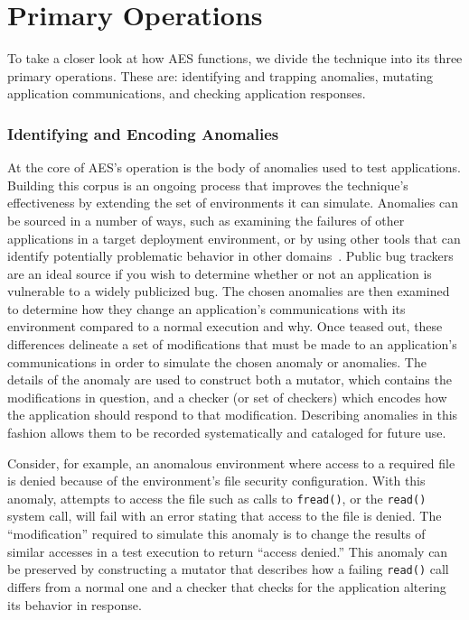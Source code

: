\section{Primary Operations}
\label{SEC:PrimaryOperations}

To take a closer look at how AES functions,
we divide the technique
into its three primary operations.
These are:
identifying and trapping anomalies,
mutating application communications,
and checking application responses.

\subsubsection{Identifying and Encoding Anomalies}
\label{SUBSUB:IdentifyingAndEncoding}
At the core of AES's operation is the body of anomalies
used to test applications.
Building this corpus is an ongoing process that improves the technique's
effectiveness by extending the set of environments it can simulate.
Anomalies can be sourced
in a number of ways,
such as
examining the failures of other applications
in a target deployment environment,
or by using other tools that can identify
potentially problematic behavior in other domains~\cite{Zhuang_NSDI_2014,
rasley2015detecting}.
Public bug trackers are an ideal source
if you wish to determine
whether or not an application
is vulnerable to a widely publicized bug.
The chosen anomalies are then examined
to determine how they change an application's communications
with its environment
compared to a normal execution and why.
Once teased out,
these differences delineate
a set of modifications
that must be made to an application's communications
in order to simulate the chosen anomaly or anomalies.
The details of the anomaly are used to
construct both a mutator,
which contains the modifications in question,
and a checker
(or set of checkers)
which encodes how the application should respond to that modification.
Describing anomalies in this fashion
allows them to be recorded systematically and cataloged for future use.

Consider,
for example,
an anomalous environment
where access to a required file is denied because of
the environment's file security configuration.
With this anomaly,
attempts to access the file
such as calls to {\tt fread()},
or the {\tt read()} system call,
will fail with an error stating that access to the file is denied.
The ``modification'' required to simulate this anomaly
is to change the results of similar accesses
in a test execution
to return ``access denied.''
This anomaly can be preserved by constructing a mutator that describes how
a failing {\tt read()} call differs from a normal one and a checker that checks for
the application altering its behavior in response.


